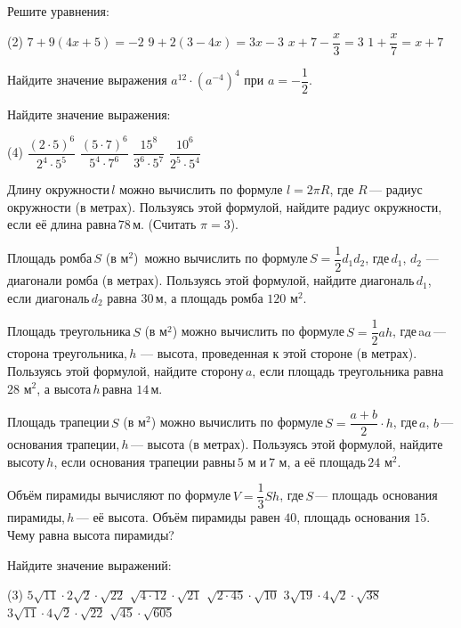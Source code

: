 \begin{class}[number=2]
	\begin{listofex}
		\item Решите уравнения:
		\begin{tasks}(2)
			\task \( 7+9(4x+5)=-2 \)
			\task \( 9+2(3-4x)=3x-3 \)
			\task \( x+7-\dfrac{x}{3}=3 \)
			\task \( 1+\dfrac{x}{7}=x+7 \)
		\end{tasks}
		\item Найдите значение выражения \( a^{12}\cdot(a^{-4})^4 \) при \( a=-\dfrac{1}{2} \).
		\item Найдите значение выражения:
		\begin{tasks}(4)
			\task \( \dfrac{(2\cdot5)^6}{2^4\cdot5^5} \)
			\task \( \dfrac{(5\cdot7)^6}{5^4\cdot7^6} \)
			\task \( \dfrac{15^8}{3^6\cdot5^7} \)
			\task \( \dfrac{10^6}{2^5\cdot5^4} \)
		\end{tasks}
		\item Длину окружности \( l \) можно вычислить по формуле \( l=2\pi R \), где \( R \) --- радиус окружности (в метрах). Пользуясь этой формулой, найдите радиус окружности, если её длина равна \( 78 \) м. (Считать \( \pi=3 \)).
		\item Площадь ромба \( S \) (в м\( ^2 \))  можно вычислить по формуле \( S=\dfrac{1}{2}d_1d_2 \),  где \( d_1 \), \( d_2 \) --- диагонали ромба (в метрах). Пользуясь этой формулой, найдите диагональ \( d_1 \), если диагональ \( d_2 \) равна \( 30 \) м, а площадь ромба \( 120 \) м\( ^2 \).
		\item Площадь треугольника \( S \) (в м\( ^2 \)) можно вычислить по формуле \( S=\dfrac{1}{2}ah \),  где a\( a \) --- сторона треугольника, \( h \) --- высота, проведенная к этой стороне (в метрах). Пользуясь этой формулой, найдите сторону \( a \), если площадь треугольника равна \( 28 \) м\( ^2 \), а высота \( h \) равна \( 14 \) м.
		\item Площадь трапеции \( S \) (в м\( ^2 \)) можно вычислить по формуле \( S=\dfrac{a+b}{2}\cdot h \),  где \( a \), \( b \) --- основания трапеции, \( h \) --- высота (в метрах). Пользуясь этой формулой, найдите высоту \( h \), если основания трапеции равны \( 5 \) м и \( 7 \) м, а её площадь \( 24 \) м\( ^2 \).
		\item Объём пирамиды вычисляют по формуле \(V=\dfrac{ 1 }{ 3 }Sh\),  где \(S\) --- площадь основания пирамиды, \(h\) --- её высота. Объём пирамиды равен \(40\), площадь основания \(15\). Чему равна высота пирамиды?
		\item Найдите значение выражений:
		\begin{tasks}(3)
			\task \( 5\sqrt{11}\cdot2\sqrt{2}\cdot\sqrt{22} \)
			\task \( \sqrt{4\cdot12}\cdot\sqrt{21} \)
			\task \( \sqrt{2\cdot45}\cdot\sqrt{10} \)
			\task \( 3\sqrt{19}\cdot4\sqrt{2}\cdot\sqrt{38} \)
			\task \( 3\sqrt{11}\cdot4\sqrt{2}\cdot\sqrt{22} \)
			\task \( \sqrt{45}\cdot\sqrt{605} \)
		\end{tasks}
	\end{listofex}
\end{class}

